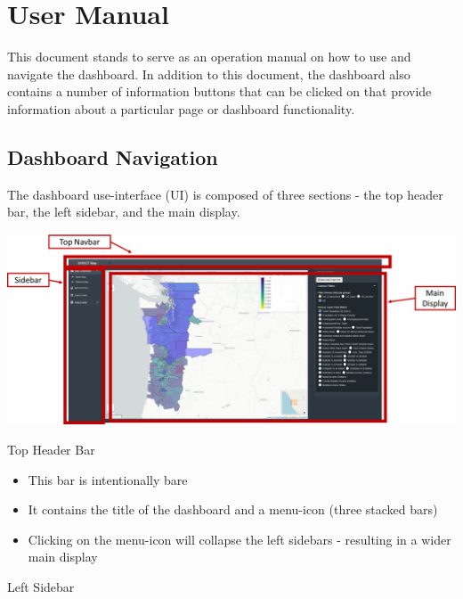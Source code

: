 \documentclass[
]{article}
\providecommand{\tightlist}{%
  \setlength{\itemsep}{0pt}\setlength{\parskip}{0pt}}
\begin{document}
\hypertarget{user-manual}{%
\section{User Manual}\label{user-manual}}

This document stands to serve as an operation manual on how to use and
navigate the dashboard. In addition to this document, the dashboard also
contains a number of information buttons that can be clicked on that
provide information about a particular page or dashboard functionality.

\hypertarget{dashboard-navigation}{%
\subsection{Dashboard Navigation}\label{dashboard-navigation}}

The dashboard use-interface (UI) is composed of three sections - the top
header bar, the left sidebar, and the main display.

\includegraphics{./www/dashboard_overview.png}

Top Header Bar

\begin{itemize}
\tightlist
\item
  This bar is intentionally bare
\item
  It contains the title of the dashboard and a menu-icon (three stacked
  bars)
\item
  Clicking on the menu-icon will collapse the left sidebars - resulting
  in a wider main display
\end{itemize}

Left Sidebar
\end{document}
